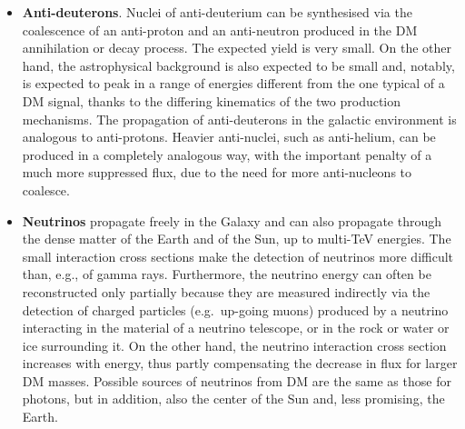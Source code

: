 \begin{itemize}
\item[$\circ$] {\bf Anti-deuterons}. Nuclei of anti-deuterium can be synthesised via the coalescence of an anti-proton and an anti-neutron produced in the DM annihilation or decay process. The expected yield is very small. On the other hand, the astrophysical background is also expected to be small and, notably, is expected to peak in a range of energies different from the one typical of a  DM signal, thanks to the differing kinematics of the two production mechanisms. The propagation of anti-deuterons in the galactic environment is analogous to anti-protons. Heavier anti-nuclei, such as anti-helium, can be produced in a completely analogous way, with the important penalty of a much more suppressed flux, due to the need for more anti-nucleons to coalesce.

\item[$\circ$] {\bf Neutrinos} propagate freely in the Galaxy and can also propagate through the dense matter of the Earth and of the Sun,
up to multi-TeV energies.
The small interaction cross sections make the detection of neutrinos more difficult than, e.g., of gamma rays. Furthermore, the neutrino energy can often be reconstructed only partially because they are measured indirectly via the detection of charged particles (e.g.\ up-going muons) produced by a neutrino interacting in the material of a neutrino telescope, or in the rock or water or ice surrounding it. 
On the other hand, the  neutrino interaction cross section increases with energy, thus partly compensating the decrease in flux for larger DM masses.
Possible sources of neutrinos from DM are the same as those for photons, but in addition, also the center of the Sun and, less promising, the Earth.
 
\end{itemize}

